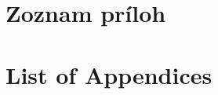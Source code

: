 \documentclass[]{fitthesis} %
\theoremstyle{definition}
\begin{document}
  \maketitle
  \tableofcontents

\ifczech
  \renewcommand\listfigurename{Seznam obrázků}
\fi
\ifslovak
  \renewcommand\listfigurename{Zoznam obrázkov}
\fi

\ifczech
  \renewcommand\listtablename{Seznam tabulek}
\fi
\ifslovak
  \renewcommand\listtablename{Zoznam tabuliek}
\fi



\ifslovak
  \makeatletter
  \def\@openbib@code{\addcontentsline{toc}{chapter}{Literatúra}}
  \makeatother
  
\else
  \ifczech
    \makeatletter
    \def\@openbib@code{\addcontentsline{toc}{chapter}{Literatura}}
    \makeatother
    
  \else
    \makeatletter
    \def\@openbib@code{\addcontentsline{toc}{chapter}{Bibliography}}
    \makeatother
    
  \fi
\fi
  \begin{flushleft}
  \end{flushleft}

  \appendix
\ifczech
  \renewcommand{\appendixpagename}{Přílohy}
  \renewcommand{\appendixtocname}{Přílohy}
  \renewcommand{\appendixname}{Příloha}
\fi
\ifslovak
  \renewcommand{\appendixpagename}{Prílohy}
  \renewcommand{\appendixtocname}{Prílohy}
  \renewcommand{\appendixname}{Príloha}
\fi
  \appendixpage

\ifslovak
  \section*{Zoznam príloh}
\else
  \ifczech
  \else
    \section*{List of Appendices}
  \fi
\fi
  \nocite{*}
\end{document}
